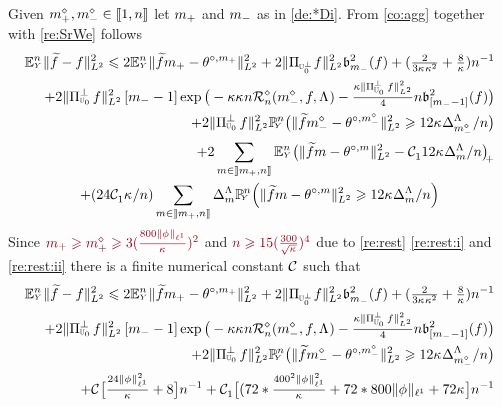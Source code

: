 \begin{pro}
Given $m^\diamond_{+},m^\diamond_{-}\in{\left\llbracket 1,n\right\rrbracket }$ let $m_{+}$ and $m_{-}$
  as in \eqref{de:*Di}. 
From  \cref{co:agg} together with  \cref{re:SrWe} follows
  \begin{multline*}
\FuEx[\ssY]{\rY}\VnormLp{\txdf-\xdf}^2\leq 2\FuEx[\ssY]{\rY}\VnormLp{\txdfPr[\pDi]-\xdfPr[\pDi]}^2+2\VnormLp{\Proj[{\mHiH[0]^\perp}]\xdf}^2\bias[\mDi]^2(\xdf)+(\tfrac{2}{3\cpen\rWc^{2}}+ \tfrac{8}{\rWc})\ssY^{-1}\\\hfill
\hfill+2\VnormLp{\Proj[{\mHiH[0]}]^\perp\xdf}^2\,[\mDi-1]\exp\big(-\rWc\cpen\ssY\hRa{\mdDi,\xdf,\iSv}-
    \tfrac{\rWc\VnormLp{\Proj[{\mHiH[0]}]^\perp\xdf}^2}{4}\ssY\bias[{[\mDi-1]}]^2(\xdf)\big)
    \\\hfill+2\VnormLp{\Proj[{\mHiH[0]}]^\perp\xdf}^2\FuVg[\ssY]{\rY}\big(\VnormLp{\txdfPr[\mdDi]-\xdfPr[\mdDi]}^2\geq\penSv[\mdDi]\big)\\\hfill
+2\sum_{\Di\in\nsetlo{\pDi,\ssY}}\FuEx[\ssY]{\rY}\vectp{\VnormLp{\txdfPr-\xdfPr}^2-\cst{1}\penSv}\\
+(24\cst{1}\cpen/\ssY)\sum_{\Di\in\nsetlo{\pDi,\ssY}}\DipenSv\FuVg[\ssY]{\rY}\vect{\VnormLp{\txdfPr-\xdfPr}^2\geq\penSv}
 \end{multline*}
Since $\dr\pDi\geq\pdDi\geq3(\tfrac{800\Vnormlp[1]{\fydf}}{\cpen})^2$  and  $\dr n\geq
  15(\tfrac{300}{\sqrt{\cpen}})^4$ due to \cref{re:rest}
  \ref{re:rest:i} and \ref{re:rest:ii} there is a finite numerical constant
  ${\mathcal C}^{}_{}$ such that
\begin{multline*}
\FuEx[\ssY]{\rY}\VnormLp{\txdf-\xdf}^2\leq 2\FuEx[\ssY]{\rY}\VnormLp{\txdfPr[\pDi]-\xdfPr[\pDi]}^2+2\VnormLp{\Proj[{\mHiH[0]^\perp}]\xdf}^2\bias[\mDi]^2(\xdf)+(\tfrac{2}{3\cpen\rWc^{2}}+ \tfrac{8}{\rWc})\ssY^{-1}\\\hfill
\hfill+2\VnormLp{\Proj[{\mHiH[0]}]^\perp\xdf}^2\,[\mDi-1]\exp\big(-\rWc\cpen\ssY\hRa{\mdDi,\xdf,\iSv}-
    \tfrac{\rWc\VnormLp{\Proj[{\mHiH[0]}]^\perp\xdf}^2}{4}\ssY\bias[{[\mDi-1]}]^2(\xdf)\big)
    \\\hfill+2\VnormLp{\Proj[{\mHiH[0]}]^\perp\xdf}^2\FuVg[\ssY]{\rY}\big(\VnormLp{\txdfPr[\mdDi]-\xdfPr[\mdDi]}^2\geq\penSv[\mdDi]\big)\\\hfill
+\cst{}\big[\tfrac{24\Vnormlp[1]{\fydf}^2}{\cpen}+8\big]\ssY^{-1}
+ \cst{1}\big[
(72*\tfrac{400^2\Vnormlp[1]{\fydf}^2}{\cpen}+72*800\Vnormlp[1]{\fydf}
+ 72\cpen\big]\ssY^{-1}

\end{multline*}
\end{pro}
